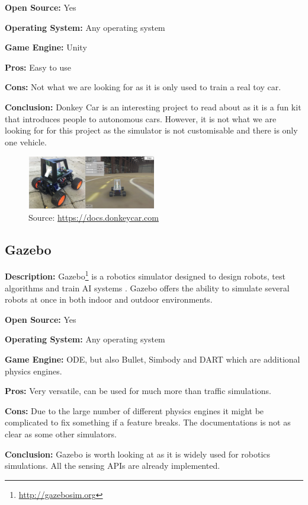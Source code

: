 \textbf{Open Source:} Yes

\textbf{Operating System:} Any operating system

\textbf{Game Engine:} Unity

\textbf{Pros:} Easy to use

\textbf{Cons:} Not what we are looking for as it is only used to train a real toy car.

\textbf{Conclusion:} Donkey Car is an interesting project to read about as it is a fun kit that introduces people to autonomous cars. However, it is not what we are looking for for this project as the simulator is not customisable and there is only one vehicle. 


\begin{figure}[H]
    \centering
    \includegraphics[width=0.5\textwidth]{Simulators/DonkeySim.jpg}
    \caption{Source: \url{https://docs.donkeycar.com}}
\end{figure}

\subsection{Gazebo}\label{gazebo}
\textbf{Description:} Gazebo\footnote{\url{http://gazebosim.org}} is a robotics simulator designed to design robots, test algorithms and train AI systems \cite{Gazebo_Website}. Gazebo offers the ability to simulate several robots at once in both indoor and outdoor environments.

\textbf{Open Source:} Yes

\textbf{Operating System:} Any operating system

\textbf{Game Engine:} ODE, but also Bullet, Simbody and DART which are additional physics engines. 

\textbf{Pros:} Very versatile, can be used for much more than traffic simulations. 

\textbf{Cons:} Due to the large number of different physics engines it might be complicated to fix something if a feature breaks. The documentations is not as clear as some other simulators. 

\textbf{Conclusion:} Gazebo is worth looking at as it is widely used for robotics simulations. All the sensing APIs are already implemented.


